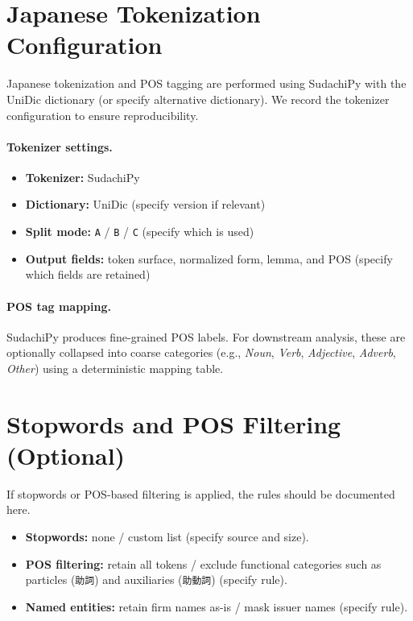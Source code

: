 \section{Japanese Tokenization Configuration}
\label{appendix:tokenization_config}

Japanese tokenization and POS tagging are performed using SudachiPy with the UniDic dictionary (or specify alternative dictionary). We record the tokenizer configuration to ensure reproducibility.

\paragraph{Tokenizer settings.}
\begin{itemize}
  \item \textbf{Tokenizer:} SudachiPy
  \item \textbf{Dictionary:} UniDic (specify version if relevant)
  \item \textbf{Split mode:} \texttt{A} / \texttt{B} / \texttt{C} (specify which is used)
  \item \textbf{Output fields:} token surface, normalized form, lemma, and POS (specify which fields are retained)
\end{itemize}

\paragraph{POS tag mapping.}
SudachiPy produces fine-grained POS labels. For downstream analysis, these are optionally collapsed into coarse categories (e.g., \emph{Noun}, \emph{Verb}, \emph{Adjective}, \emph{Adverb}, \emph{Other}) using a deterministic mapping table.

\section{Stopwords and POS Filtering (Optional)}
\label{appendix:stopwords_pos_filter}

If stopwords or POS-based filtering is applied, the rules should be documented here.

\begin{itemize}
  \item \textbf{Stopwords:} none / custom list (specify source and size).
  \item \textbf{POS filtering:} retain all tokens / exclude functional categories such as particles (\texttt{助詞}) and auxiliaries (\texttt{助動詞}) (specify rule).
  \item \textbf{Named entities:} retain firm names as-is / mask issuer names (specify rule).
\end{itemize}

